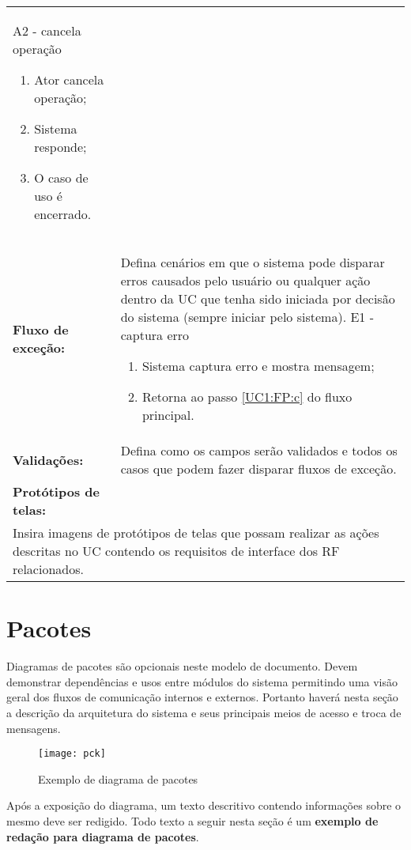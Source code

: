 \documentclass[12pt,openright,a4paper,brazil]{abntex2}
\begin{document}
\begin{longtable}{p{.25\linewidth}p{.7\linewidth}}
\label{UC1:FA:A2} A2 - cancela operação
\begin{enumerate}[label=\alph*)]
	\item Ator cancela operação;
	\item Sistema responde;
	\item O caso de uso é encerrado.
\end{enumerate} \\
\textbf{Fluxo de exceção:} &
Defina cenários em que o sistema pode disparar erros causados pelo usuário ou qualquer ação dentro da UC que tenha sido iniciada por decisão do sistema (sempre iniciar pelo sistema).
\vspace{\onelineskip}
\label{UC1:FE:E1} E1 - captura erro
\begin{enumerate}[label=\alph*)]
	\item Sistema captura erro e mostra mensagem;
	\item Retorna ao passo \ref{UC1:FP:c} do fluxo principal.
\end{enumerate} \\
\textbf{Validações:} & Defina como os campos serão validados e todos os casos que podem fazer disparar fluxos de exceção. \\
\textbf{Protótipos de telas:} & \\
\multicolumn{2}{p{\linewidth}}{
	Insira imagens de protótipos de telas que possam realizar as ações descritas no UC contendo os requisitos de interface dos RF relacionados.
} \\
\end{longtable} 

\clearpage
\section{Pacotes}

Diagramas de pacotes são opcionais neste modelo de documento. Devem demonstrar dependências e usos entre módulos do sistema permitindo uma visão geral dos fluxos de comunicação internos e externos. Portanto haverá nesta seção a descrição da arquitetura do sistema e seus principais meios de acesso e troca de mensagens.

\begin{figure}[!h]
	\centering
	\texttt{[image: pck]}
	\caption{Exemplo de diagrama de pacotes}
	\label{fig:pck}
\end{figure}

Após a exposição do diagrama, um texto descritivo contendo informações sobre o mesmo deve ser redigido. Todo texto a seguir nesta seção é um \textbf{exemplo de redação para diagrama de pacotes}.
\end{document}
